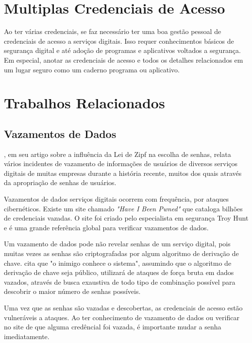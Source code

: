 \documentclass[12pt]{article}
\begin{document}
\section{Multiplas Credenciais de Acesso}

Ao ter várias credenciais, se faz necessário ter uma boa gestão pessoal de credenciais
de acesso a serviços digitais.
Isso requer conhecimentos básicos de segurança digital e até adoção de programas e
aplicativos voltados a segurança.
Em especial, anotar as credenciais de acesso e todos os detalhes relacionados em um
lugar seguro como um caderno programa ou aplicativo.

\section{Trabalhos Relacionados}

\subsection{Vazamentos de Dados}

\cite{article:1}, em seu artigo sobre a influência da Lei de Zipf na
escolha de senhas, relata vários incidentes de vazamento de informações de
usuários de diversos serviços digitais de muitas empresas durante a história
recente, muitos dos quais através da apropriação de senhas de usuários.

Vazamentos de dados serviços digitais ocorrem com frequência, por ataques
cibernéticos.
Existe um site chamado \textit{"Have I Been Pwned"} \cite{hibp} que cataloga bilhões de
credenciais vazadas.
O site foi criado pelo especialista em segurança Troy Hunt e é uma grande
referência global para verificar vazamentos de dados.

Um vazamento de dados pode não revelar senhas de um serviço digital, pois muitas
vezes as senhas são criptografadas por algum algoritmo de derivação de chave.
\cite{article:1} cita que "o inimigo conhece o sistema", assumindo que o algoritmo
de derivação de chave seja público, utilizará de ataques de força bruta em dados
vazados, através de busca exaustiva de todo tipo de combinação possível para
descobrir o maior número de senhas possíveis.

Uma vez que as senhas são vazadas e descobertas, as credenciais de acesso estão
vulneráveis a ataques.
Ao ter conhecimento de vazamento de dados ou verificar no site de \cite{hibp} que
alguma credêncial foi vazada, é importante mudar a senha imediatamente.
\end{document}
